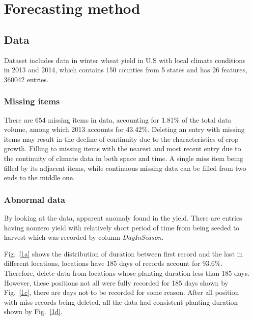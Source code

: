 \documentclass[conference]{IEEEtran}
\begin{document}
\section{Forecasting method} \label{sec:fm}
  \subsection{Data} 
    Dataset includes data in winter wheat yield in U.S with local climate conditions in 2013 and 2014, which contains 150 counties from 5 states and has 26 features, 360042 entries.

    \subsubsection{Missing items}
      There are 654 missing items in data, accounting for 1.81\% of the total data volume, among which 2013 accounts for 43.42\%. Deleting an entry with missing items may result in the decline of continuity due to the characteristics of crop growth. Filling to missing items with the nearest and most recent entry due to the continuity of climate data in both space and time. A single miss item being filled by its adjacent items, while continuous missing data can be filled from two ends to the middle one.

    \subsubsection{Abnormal data}
      By looking at the data, apparent anomaly found in the yield. There are entries having nonzero yield with relatively short period of time from being seeded to harvest which was recorded by column \textit{DayInSeason}. 

      Fig.~\ref{1a} shows the distribution of duration between first record and the last in different locations, locations have 185 days of records account for 93.6\%. Therefore, delete data from locations whose planting duration less than 185 days. However, these positions not all were fully recorded for 185 days shown by Fig.~\ref{1c}, there are days not to be recorded for some reason. After all position with miss records being deleted, all the data had consistent planting duration shown by Fig.~\ref{1d}.
\end{document}
